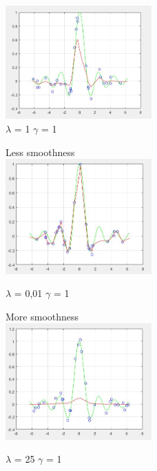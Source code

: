 \begin{figure}
	\centering
	\includegraphics[width=0.5\textwidth]{kml1g1.png}
	\caption{$\lambda$ = 1 $\gamma$ = 1}

\end{figure}
\begin{figure}
Less smoothness\\

	\centering
	\includegraphics[width=0.5\textwidth]{kml1g001.png}
	\caption{$\lambda$ = 0,01 $\gamma$ = 1}

\end{figure}
\begin{figure}
More smoothness\\

	\centering
	\includegraphics[width=0.5\textwidth]{kml1g25.png}
	\caption{$\lambda$ = 25 $\gamma$ = 1}

\end{figure}

